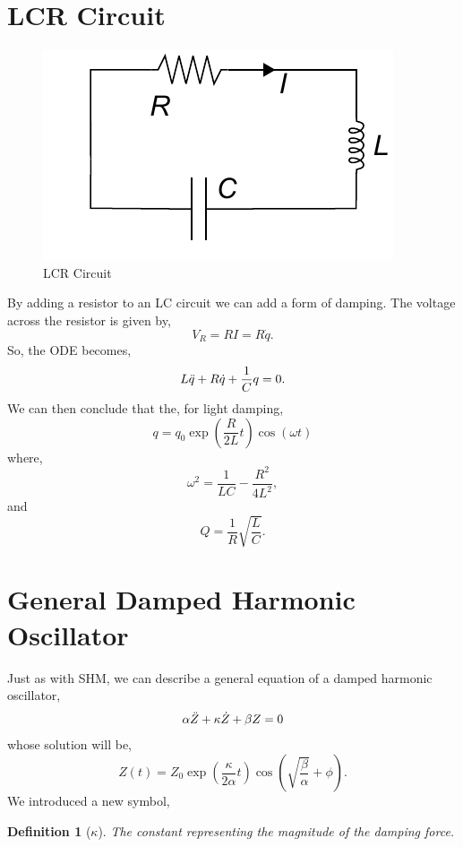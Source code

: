 \documentclass{book}
\newtheorem*{definition}{Definition}
\begin{document}
\section{LCR Circuit}
\begin{figure}[h]
    \centering
    \includegraphics{RLC_circuit.pdf}
    \caption{LCR Circuit}
    \label{fig:LCR}
\end{figure}
By adding a resistor to an LC circuit we can add a form of damping. The voltage across the resistor is given by,
\begin{equation}
    V_R = RI = R\Dot{q}.
\end{equation}
So, the ODE becomes,
\begin{equation}
    L\Ddot{q} + R\Dot{q} + \frac{1}{C}q = 0.
\end{equation}
We can then conclude that the, for light damping, 
\begin{equation}
    q = q_0 \exp\left(\frac{R}{2L}t\right)\cos(\omega t)
\end{equation}
where,
\begin{equation}
    \omega^2 = \frac{1}{LC} - \frac{R^2}{4L^2},
\end{equation}
and
\begin{equation}
    Q = \frac{1}{R}\sqrt{\frac{L}{C}}.
\end{equation}
\section{General Damped Harmonic Oscillator}
Just as with SHM, we can describe a general equation of a damped harmonic oscillator,
\begin{equation}
    \alpha \Ddot{Z} + \kappa \Dot{Z} + \beta Z = 0 
\end{equation}
whose solution will be,
\begin{equation}
    Z(t) = Z_0 \exp\left(\frac{\kappa}{2\alpha}t\right)\cos\left(\sqrt{\frac{\beta}{\alpha}} + \phi\right).
\end{equation}
We introduced a new symbol,
\begin{definition}[$\kappa$]
    The constant representing the magnitude of the damping force.
\end{definition}
\end{document}
